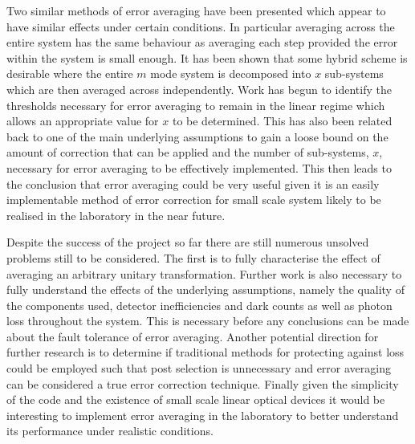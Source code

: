 \documentclass[aps,pra,twocolumn,superscriptaddress,numerical]{revtex4-1}
\begin{document}
	Two similar methods of error averaging have been presented which appear to have similar effects under certain conditions. In particular averaging across the entire system has the same behaviour as averaging each step provided the error within the system is small enough. It has been shown that some hybrid scheme is desirable where the entire $m$ mode system is decomposed into $x$ sub-systems which are then averaged across independently. Work has begun to identify the thresholds necessary for error averaging to remain in the linear regime which allows an appropriate value for $x$ to be determined. This has also been related back to one of the main underlying assumptions to gain a loose bound on the amount of correction that can be applied and the number of sub-systems, $x$, necessary for error averaging to be effectively implemented. This then leads to the conclusion that error averaging could be very useful given it is an easily implementable method of error correction for small scale system likely to be realised in the laboratory in the near future.
	
	Despite the success of the project so far there are still numerous unsolved problems still to be considered. The first is to fully characterise the effect of averaging an arbitrary unitary transformation. Further work is also necessary to fully understand the effects of the underlying assumptions, namely the quality of the components used, detector inefficiencies and dark counts as well as photon loss throughout the system. This is necessary before any conclusions can be made about the fault tolerance of error averaging. Another potential direction for further research is to determine if traditional methods for protecting against loss \cite{LossCorrectionTim,LossCorrection}  could be employed such that post selection is unnecessary and error averaging can be considered a true error correction technique. Finally given the simplicity of the code and the existence of small scale linear optical devices it would be interesting to implement error averaging in the laboratory to better understand its performance under realistic conditions. 
	

\end{document}
